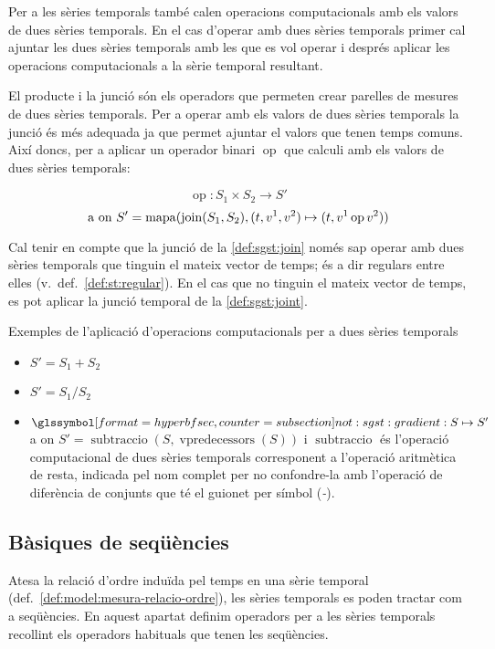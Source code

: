 Per a les sèries temporals també calen operacions computacionals amb
els valors de dues sèries temporals. En el cas d'operar amb dues
sèries temporals primer cal ajuntar les dues sèries temporals amb les
que es vol operar i després aplicar les operacions computacionals a la
sèrie temporal resultant.


El producte i la junció són els operadors que permeten crear parelles
de mesures de dues sèries temporals. Per a operar amb els valors de
dues sèries temporals la junció és més adequada ja que permet ajuntar
el valors que tenen temps comuns. Així doncs, per a aplicar un
operador binari $\operatorname{op}$ que calculi amb els valors de
dues sèries temporals:

\[
\operatorname{op}: S_1 \times S_2 \longrightarrow S'
\]
\[
\text{a on } S' = \operatorname*{mapa}(\operatorname*{join}(S_1,S_2),(t,v^1,v^2)\mapsto(t,v^1
\operatorname{op} v^2))
\]

Cal tenir en compte que la junció de la \autoref{def:sgst:join} només
sap operar amb dues sèries temporals que tinguin el mateix vector de
temps; és a dir regulars entre elles (v.\
def.~\ref{def:st:regular}). En el cas que no tinguin el mateix vector
de temps, es pot aplicar la junció temporal de la
\autoref{def:sgst:joint}.


Exemples de l'aplicació d'operacions computacionals per a dues sèries
temporals
\begin{itemize}
\item $S' = S_1 + S_2$
\item $S' = S_1 / S_2$
\item $\glssymbolsec{not:sgst:gradient}: S \mapsto S'$ a on $S'=
  \operatorname{subtraccio}(S, \operatorname{vpredecessors}(S))$ i
  $\operatorname{subtraccio}$ és l'operació computacional de dues
  sèries temporals corresponent a l'operació aritmètica de resta,
  indicada pel nom complet per no confondre-la amb l'operació de diferència de
  conjunts que té el guionet per símbol (\emph{-}).
\end{itemize}









\subsection{Bàsiques de seqüències}

Atesa la relació d'ordre induïda pel temps en una sèrie temporal
(def.\ \ref{def:model:mesura-relacio-ordre}), les sèries temporals es
poden tractar com a seqüències.  En aquest apartat definim operadors
per a les sèries temporals recollint els operadors habituals que tenen
les seqüències.

